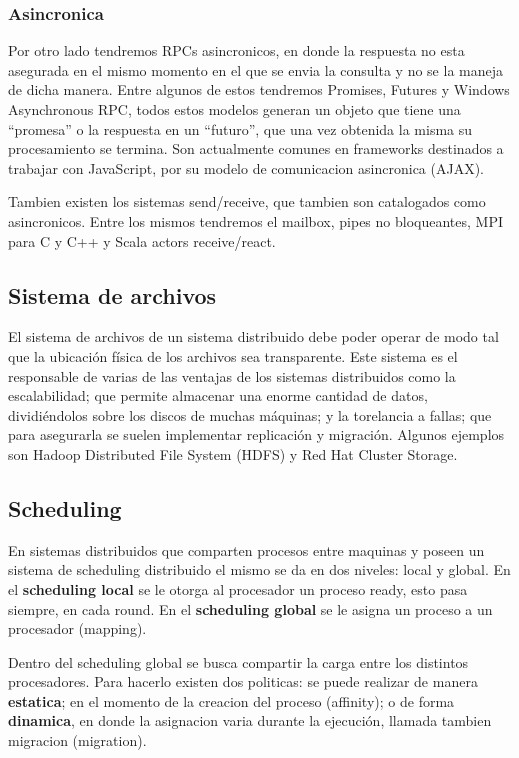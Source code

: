 \documentclass{article}
\begin{document}
\subsubsection{Asincronica}

Por otro lado tendremos RPCs asincronicos, en donde la respuesta no esta asegurada en el mismo momento en el que se envia la consulta y no se la maneja de dicha manera. Entre algunos de estos tendremos Promises, Futures y Windows Asynchronous RPC, todos estos modelos generan un objeto que tiene una ``promesa'' o la respuesta en un ``futuro'', que una vez obtenida la misma su procesamiento se termina. Son actualmente comunes en frameworks destinados a trabajar con JavaScript, por su modelo de comunicacion asincronica (AJAX).

Tambien existen los sistemas send/receive, que tambien son catalogados como asincronicos. Entre los mismos tendremos el mailbox, pipes no bloqueantes, MPI para C y C++ y Scala actors receive/react.

\subsection{Sistema de archivos}

El sistema de archivos de un sistema distribuido debe poder operar de modo tal que la ubicación física de los archivos sea transparente. Este sistema es el responsable de varias de las ventajas de los sistemas distribuidos como la escalabilidad; que permite almacenar una enorme cantidad de datos, dividiéndolos sobre los discos de muchas máquinas; y la torelancia a fallas; que para asegurarla se suelen implementar replicación y migración. Algunos ejemplos son Hadoop Distributed File System (HDFS) y Red Hat Cluster Storage.

\subsection{Scheduling}

En sistemas distribuidos que comparten procesos entre maquinas y poseen un sistema de scheduling distribuido el mismo se da en dos niveles: local y global. En el \textbf{scheduling local} se le otorga al procesador un proceso ready, esto pasa siempre, en cada round. En el \textbf{scheduling global} se le asigna un proceso a un procesador (mapping).

Dentro del scheduling global se busca compartir la carga entre los distintos procesadores. Para hacerlo existen dos politicas: se puede realizar de manera \textbf{estatica}; en el momento de la creacion del proceso (affinity); o de forma \textbf{dinamica}, en donde la asignacion varia durante la ejecución, llamada tambien migracion (migration).
\end{document}
